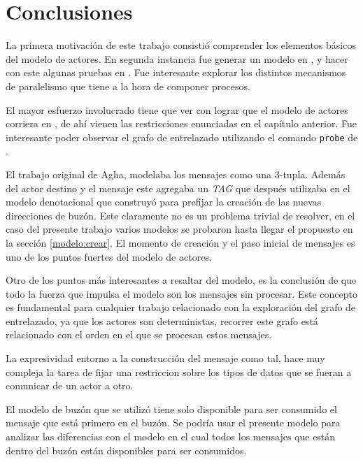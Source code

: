 \chapter{Conclusiones}

La primera motivación de este trabajo consistió comprender los elementos básicos del modelo de actores. En segunda instancia fue generar un modelo en \CSP, y hacer con este algunas pruebas en \FDR. Fue interesante explorar los distintos mecanismos de paralelismo que tiene \CSP a la hora de componer procesos.

El mayor esfuerzo involucrado tiene que ver con lograr que el modelo de actores corriera en \FDR, de ahí vienen las restricciones enunciadas en el capítulo anterior. Fue interesante poder observar el grafo de entrelazado utilizando el comando \verb=probe= de \FDR. 

El trabajo original de Agha\cite{Agha:1986:AMC:7929}, modelaba los mensajes como una 3-tupla. Además del actor destino y el mensaje este agregaba un \textit{TAG} que después utilizaba en el modelo denotacional que construyó para prefijar la creación de las nuevas direcciones de buzón. Este claramente no es un problema trivial de resolver, en el caso del presente trabajo varios modelos se probaron hasta llegar el propuesto en la sección \ref{modelo:crear}. El momento de creación y el paso inicial de mensajes es uno de los puntos fuertes del modelo de actores.

Otro de los puntos más interesantes a resaltar del modelo, es la conclusión de que todo la fuerza que impulsa el modelo son los mensajes sin procesar. Este concepto es fundamental para cualquier trabajo relacionado con la exploración del grafo de entrelazado, ya que los actores son deterministas, recorrer este grafo está relacionado con el orden en el que se procesan estos mensajes.

La expresividad entorno a la construcción del mensaje como tal, hace muy compleja la tarea de fijar una restriccion sobre los tipos de datos que se fueran a comunicar de un actor a otro.

El modelo de buzón que se utilizó tiene solo disponible para ser consumido el mensaje que está primero en el buzón. Se podría usar el presente modelo para analizar las diferencias con el modelo en el cual todos los mensajes que están dentro del buzón están disponibles para ser consumidos.
